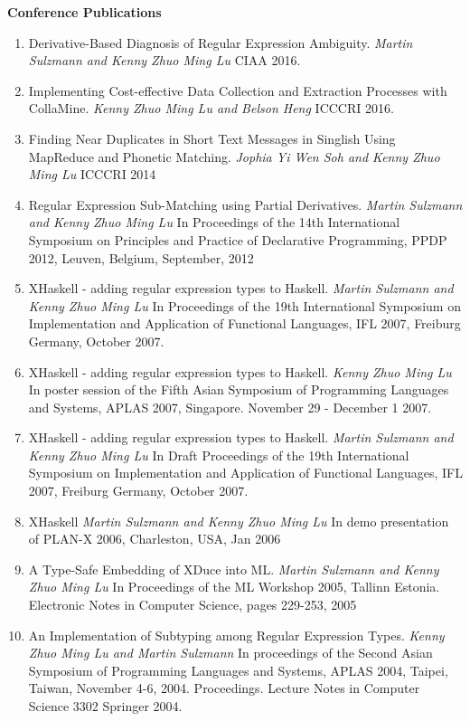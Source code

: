 \documentclass[margin,line]{res}
\begin{document}
\begin{resume}
{{\bf Conference Publications}
\begin{enumerate}
\item Derivative-Based Diagnosis of Regular Expression
  Ambiguity. \textit{Martin Sulzmann and Kenny Zhuo Ming Lu} CIAA 2016.
\item Implementing Cost-effective Data Collection and Extraction
  Processes with CollaMine. \textit{Kenny Zhuo Ming Lu and Belson
    Heng} ICCCRI 2016.
\item Finding Near Duplicates in Short Text Messages in Singlish Using
  MapReduce and Phonetic Matching. \textit{ Jophia Yi Wen Soh and
    Kenny Zhuo Ming Lu} ICCCRI 2014
\item Regular Expression Sub-Matching using Partial Derivatives. \textit{Martin Sulzmann and Kenny Zhuo Ming Lu} 
In Proceedings of the 14th International Symposium on Principles and Practice of Declarative Programming, PPDP 2012, Leuven, Belgium, September, 2012
\item XHaskell - adding regular expression types to Haskell. \textit{Martin Sulzmann and Kenny Zhuo Ming Lu} 
In Proceedings of the 19th International Symposium on Implementation and Application of Functional Languages, IFL 2007, Freiburg Germany, October 2007.
\item XHaskell - adding regular expression types to Haskell. \textit{Kenny Zhuo Ming Lu} 
In poster session of the Fifth Asian Symposium of Programming Languages and Systems, APLAS 2007,
Singapore. November 29 - December 1 2007.
\item XHaskell - adding regular expression types to Haskell. \textit{Martin Sulzmann and Kenny Zhuo Ming Lu} 
In Draft Proceedings of the 19th International Symposium on Implementation and Application of Functional Languages, IFL 2007, Freiburg Germany, October 2007.
\item XHaskell \textit{Martin Sulzmann and Kenny Zhuo Ming Lu} 
In demo presentation of PLAN-X 2006, Charleston, USA, Jan 2006
\item A Type-Safe Embedding of XDuce into ML. \textit{Martin Sulzmann and Kenny Zhuo Ming Lu} In Proceedings of
the ML Workshop 2005, Tallinn Estonia. Electronic Notes in Computer Science, pages 229-253, 2005 
\item An Implementation of Subtyping among Regular Expression Types. \textit{Kenny Zhuo Ming Lu and Martin Sulzmann} In proceedings of the Second Asian Symposium of Programming Languages and Systems, APLAS 2004, Taipei, Taiwan, November 4-6, 2004. Proceedings. Lecture Notes in Computer Science 3302 Springer 2004.
\end{enumerate}


}
\end{resume}
\end{document}
